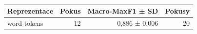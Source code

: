 \begin{tabular}{lrrr}
\toprule
Reprezentace & Pokus & Macro-MaxF1 ± SD & Pokusy\\
\midrule
word-tokens & 12 & 0,886 ± 0,006 & 20\\
\bottomrule
\end{tabular}
